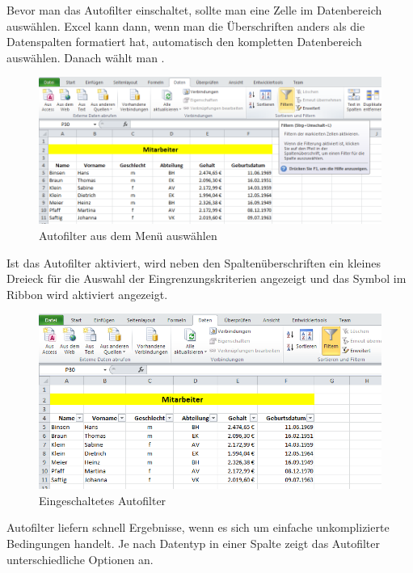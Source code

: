 \enlargethispage{1cm}
Bevor man das Autofilter einschaltet, sollte man eine Zelle im Datenbereich auswählen. Excel kann dann, wenn man die Überschriften anders als die Datenspalten formatiert hat, automatisch den kompletten Datenbereich auswählen. Danach wählt man .
	\begin{figure}[H]
		\centering
			\includegraphics[scale=0.7]{images/autofilter_raw.png}
		\caption{Autofilter aus dem Menü auswählen}
		\label{fig:autofilterMenu}
	\end{figure}%
	\vspace{-1em}
Ist das Autofilter aktiviert, wird neben den Spaltenüberschriften ein kleines Dreieck für die Auswahl der Eingrenzungskriterien angezeigt und das Symbol im Ribbon wird aktiviert angezeigt.
	\begin{figure}[H]
		\centering
			\includegraphics[scale=0.7]{images/autofilter_on}
		\caption{Eingeschaltetes Autofilter}
		\label{fig:autofilterOn}
	\end{figure}
Autofilter liefern schnell Ergebnisse, wenn es sich um einfache unkomplizierte Bedingungen handelt. Je nach Datentyp in einer Spalte zeigt das Autofilter unterschiedliche Optionen an.
